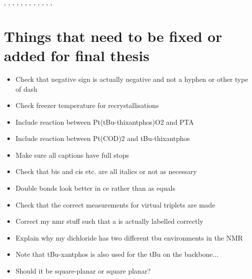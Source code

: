 ,
,
,
,
,
,
,
,
,
,
,
,

\newpage{}
\section{Things that need to be fixed or added for final thesis}
\begin{itemize}
\item{Check that negative sign is actually negative and not a hyphen or other type of dash}
\item{Check freezer temperature for recrystallisations}
\item{Include reaction between Pt(tBu-thixantphos)O2 and PTA}
\item{Include reaction between Pt(COD)2 and tBu-thixantphos}
\item{Make sure all captions have full stops}
\item{Check that bis and cis etc. are all italics or not as necessary}
\item{Double bonds look better in ce rather than as equals}
\item{Check that the correct measurements for virtual triplets are made}
\item{Correct my nmr stuff such that a is actually labelled correctly}
\item{Explain why my dichloride has two different tbu environments in the NMR}
\item{Note that tBu-xantphos is also used for the tBu on the backbone...}
\item{Should it be square-planar or square planar?}
\end{itemize}

\newpage{}
